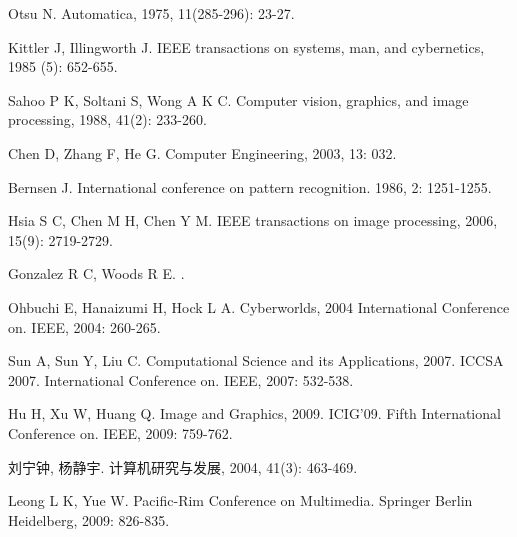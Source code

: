 \begin{thebibliography}{99} %
		
		Otsu N.  
		\newblock Automatica, 1975, 11(285-296): 23-27.
		
		Kittler J, Illingworth J. 
		\newblock IEEE transactions on systems, man, and cybernetics, 1985 (5): 652-655.
		
		Sahoo P K, Soltani S, Wong A K C. 
		\newblock Computer vision, graphics, and image processing, 1988, 41(2): 233-260.
		
		Chen D, Zhang F, He G. 
		\newblock Computer Engineering, 2003, 13: 032.
		
		Bernsen J.
		\newblock International conference on pattern recognition. 1986, 2: 1251-1255.
		
		Hsia S C, Chen M H, Chen Y M. 
		\newblock IEEE transactions on image processing, 2006, 15(9): 2719-2729.
		
		Gonzalez R C, Woods R E. 
		.
		
		Ohbuchi E, Hanaizumi H, Hock L A. 
		\newblock Cyberworlds, 2004 International Conference on. IEEE, 2004: 260-265.
		
		Sun A, Sun Y, Liu C.
		\newblock Computational Science and its Applications, 2007. ICCSA 2007. International Conference on. IEEE, 2007: 532-538.
		
		Hu H, Xu W, Huang Q.
		\newblock Image and Graphics, 2009. ICIG'09. Fifth International Conference on. IEEE, 2009: 759-762.
		
		刘宁钟, 杨静宇. 
		\newblock 计算机研究与发展, 2004, 41(3): 463-469.
		
		Leong L K, Yue W.
		\newblock Pacific-Rim Conference on Multimedia. Springer Berlin Heidelberg, 2009: 826-835.
		
		
		\newblock {\em } 
		\newblock
\end{thebibliography}